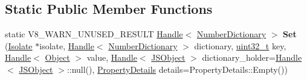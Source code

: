 \subsection*{Static Public Member Functions}
\begin{DoxyCompactItemize}
\item 
\mbox{\label{classv8_1_1internal_1_1NumberDictionary_aab9f75ae223e8cc479d7c02d4f4d24fa}} 
static V8\+\_\+\+W\+A\+R\+N\+\_\+\+U\+N\+U\+S\+E\+D\+\_\+\+R\+E\+S\+U\+LT \mbox{\hyperlink{classv8_1_1internal_1_1Handle}{Handle}}$<$ \mbox{\hyperlink{classv8_1_1internal_1_1NumberDictionary}{Number\+Dictionary}} $>$ {\bfseries Set} (\mbox{\hyperlink{classv8_1_1internal_1_1Isolate}{Isolate}} $\ast$isolate, \mbox{\hyperlink{classv8_1_1internal_1_1Handle}{Handle}}$<$ \mbox{\hyperlink{classv8_1_1internal_1_1NumberDictionary}{Number\+Dictionary}} $>$ dictionary, \mbox{\hyperlink{classuint32__t}{uint32\+\_\+t}} key, \mbox{\hyperlink{classv8_1_1internal_1_1Handle}{Handle}}$<$ \mbox{\hyperlink{classv8_1_1internal_1_1Object}{Object}} $>$ value, \mbox{\hyperlink{classv8_1_1internal_1_1Handle}{Handle}}$<$ \mbox{\hyperlink{classv8_1_1internal_1_1JSObject}{J\+S\+Object}} $>$ dictionary\+\_\+holder=\mbox{\hyperlink{classv8_1_1internal_1_1Handle}{Handle}}$<$ \mbox{\hyperlink{classv8_1_1internal_1_1JSObject}{J\+S\+Object}} $>$\+::null(), \mbox{\hyperlink{classv8_1_1internal_1_1PropertyDetails}{Property\+Details}} details=Property\+Details\+::\+Empty())
\end{DoxyCompactItemize}
